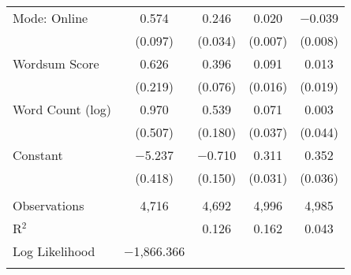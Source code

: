 \begin{table}[!htbp]
\begin{tabular}{@{\extracolsep{0pt}}lcccc}
  Mode: Online & 0.574 & 0.246 & 0.020 & $-$0.039 \\ 
  & (0.097) & (0.034) & (0.007) & (0.008) \\ 
  Wordsum Score & 0.626 & 0.396 & 0.091 & 0.013 \\ 
  & (0.219) & (0.076) & (0.016) & (0.019) \\ 
  Word Count (log) & 0.970 & 0.539 & 0.071 & 0.003 \\ 
  & (0.507) & (0.180) & (0.037) & (0.044) \\ 
  Constant & $-$5.237 & $-$0.710 & 0.311 & 0.352 \\ 
  & (0.418) & (0.150) & (0.031) & (0.036) \\ 
 \hline \\[-1.8ex] 
Observations & 4,716 & 4,692 & 4,996 & 4,985 \\ 
R$^{2}$ &  & 0.126 & 0.162 & 0.043 \\ 
Log Likelihood & $-$1,866.366 &  &  &  \\ 
\hline 
\hline \\[-1.8ex] 
\end{tabular} 
\end{table} 
